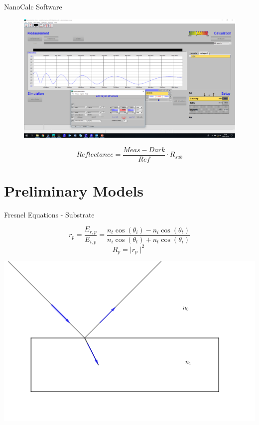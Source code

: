\documentclass[10pt]{beamer}
\begin{document}
	
	\begin{frame}{NanoCalc Software}
	
	\begin{figure}
	\includegraphics[width=\textwidth]{nanocalc.png}
	\end{figure}
	
	\begin{equation*}
	Reflectance = \frac{Meas-Dark}{Ref} \cdot R_{sub}
	\end{equation*}
	
	\end{frame}
	
	\section{Preliminary Models}
	
	\begin{frame}{Fresnel Equations - Substrate}
	
	\begin{minipage}{0.47\textwidth}
	\begin{equation*}
	r_p = \frac{E_{r,p}}{E_{i,p}} = \frac{n_t\cos(\theta_i)-n_i\cos(\theta_t)}{n_i\cos(\theta_t)+n_t\cos(\theta_i)}
	\end{equation*}
	\begin{equation*}
	R_p = \mid r_p \mid ^2 
	\end{equation*}
	\end{minipage}
	\begin{minipage}{0.5\textwidth}
	\includegraphics[scale=0.2]{subrefl.png}
	\end{minipage}
	\end{frame}
	
\end{document}
